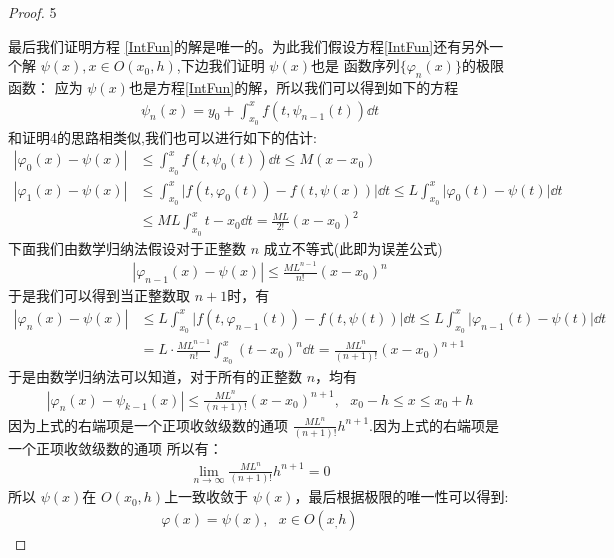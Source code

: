 \begin{proof}{\sf \color{orange} 5}\par
    最后我们证明方程 \ref{IntFun}的解是唯一的。为此我们假设方程\ref{IntFun}还有另外一个解
    $\psi(x), x\in O(x_0, h)$,下边我们证明 $\psi(x)$也是 函数序列$\{\varphi_n(x)\}$的极限函数：
    应为 $\psi(x)$也是方程\ref{IntFun}的解，所以我们可以得到如下的方程
    \begin{align*}
        \psi_n(x) = y_0 + \int_{x_0}^{x}{f(t, \psi_{n-1}(t)) \dd t}
    \end{align*}
    和\textsf{证明4}的思路相类似,我们也可以进行如下的估计:
    \begin{align*}
        |\varphi_0(x)-\psi(x)|
        &\le \int_{x_0}^{x}{f(t, \psi_0(t)) \dd t} \le M(x-x_0) \\
        |\varphi_1(x)-\psi(x)|
        &\le \int_{x_0}^{x}{\biggl|f(t, \varphi_0(t))-f(t, \psi(x)) \biggr|\dd t}
            \le L \int_{x_0}^{x}{\biggl|\varphi_0(t)-\psi(t)\biggr| \dd t}\\
        &\le ML \int_{x_0}^{x}{t-x_0 \dd t}
         = \frac{ML}{2!}(x-x_0)^2
    \end{align*}
    下面我们由数学归纳法假设对于正整数 $n$ 成立不等式(此即为\textsf{误差公式})
    \begin{align}
        \left|\varphi_{n-1}(x)-\psi(x)\right|\le \frac{ML^{n-1}}{n!}(x-x_0)^n
        \tag{7}
    \end{align}
    于是我们可以得到当正整数取 $n+1$时，有
    \begin{align*}
        \left|\varphi_{n}(x)-\psi(x)\right|
        &\le L \int_{x_0}^{x}{\biggl|f(t, \varphi_{n-1}(t)) - f(t, \psi(t))\biggr|\dd t}
            \le L \int_{x_0}^{x}{\biggl|\varphi_{n-1}(t)-\psi(t)\biggr| \dd t}\\
        & = L\cdot \frac{ML^{n-1}}{n!}\int_{x_0}^{x}{(t-x_0)^n \dd t}
          = \frac{ML^{n}}{(n+1)!}(x-x_0)^{n+1}
    \end{align*}
    于是由数学归纳法可以知道，对于所有的正整数 $n$，均有
    \begin{align*}
        \left|\varphi_{n}(x)-\psi_{k-1}(x)\right|\le \frac{ML^{n}}{(n+1)!}(x-x_0)^{n+1}, ~~~x_0-h \le x\le x_0 +h
    \end{align*}
    因为上式的右端项是一个正项收敛级数的通项 $\frac{ML^n}{(n+1)!}h^{n+1}$.因为上式的右端项是一个正项收敛级数的通项
    所以有：
    \begin{align*}
        \lim_{n\to \infty}{\frac{ML^n}{(n+1)!}h^{n+1}}=0
    \end{align*}
    所以 $\psi(x)$在 $O(x_0, h)$上一致收敛于 $\psi(x)$，最后根据极限的唯一性可以得到:
    \begin{align*}
        \varphi(x) = \psi(x), ~~~x \in O(x_, h)
    \end{align*}
\end{proof}